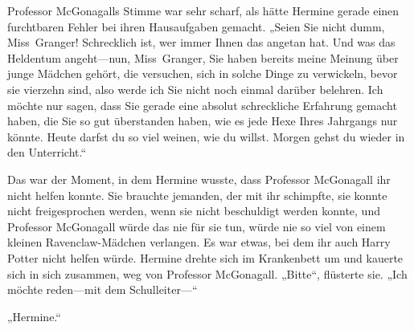 Professor McGonagalls Stimme war sehr scharf, als hätte Hermine gerade einen furchtbaren Fehler bei ihren Hausaufgaben gemacht.
„Seien Sie nicht dumm, Miss~Granger! Schrecklich ist, wer immer Ihnen das angetan hat. Und was das Heldentum angeht—nun, Miss~Granger, Sie haben bereits meine Meinung über junge Mädchen gehört, die versuchen, sich in solche Dinge zu verwickeln, bevor sie vierzehn sind, also werde ich Sie nicht noch einmal darüber belehren. Ich möchte nur sagen, dass Sie gerade eine absolut schreckliche Erfahrung gemacht haben, die Sie so gut überstanden haben, wie es jede Hexe Ihres Jahrgangs nur könnte. Heute darfst du so viel weinen, wie du willst. Morgen gehst du wieder in den Unterricht.“

Das war der Moment, in dem Hermine wusste, dass Professor McGonagall ihr nicht helfen konnte. Sie brauchte jemanden, der mit ihr schimpfte, sie konnte nicht freigesprochen werden, wenn sie nicht beschuldigt werden konnte, und Professor McGonagall würde das nie für sie tun, würde nie so viel von einem kleinen Ravenclaw-Mädchen verlangen. Es war etwas, bei dem ihr auch Harry Potter nicht helfen würde. Hermine drehte sich im Krankenbett um und kauerte sich in sich zusammen, weg von Professor McGonagall.
„Bitte“, flüsterte sie. „Ich möchte reden—mit dem Schulleiter—“

\later

„Hermine.“

